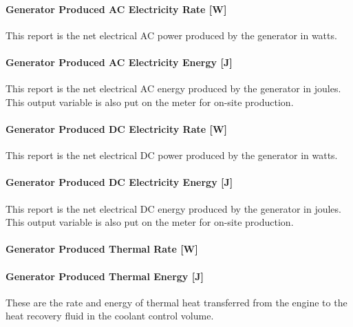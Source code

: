 \paragraph{Generator Produced AC Electricity Rate {[}W{]}}\label{generator-produced-ac-electric-power-w-3}

This report is the net electrical AC power produced by the generator in watts.

\paragraph{Generator Produced AC Electricity Energy {[}J{]}}\label{generator-produced-ac-electric-energy-j-3}

This report is the net electrical AC energy produced by the generator in joules. This output variable is also put on the meter for on-site production.

\paragraph{Generator Produced DC Electricity Rate {[}W{]}}\label{generator-produced-dc-electric-power-w-3}

This report is the net electrical DC power produced by the generator in watts.

\paragraph{Generator Produced DC Electricity Energy {[}J{]}}\label{generator-produced-dc-electric-energy-j-3}

This report is the net electrical DC energy produced by the generator in joules. This output variable is also put on the meter for on-site production.

\paragraph{Generator Produced Thermal Rate {[}W{]}}\label{generator-produced-thermal-rate-w-3}

\paragraph{Generator Produced Thermal Energy {[}J{]}}\label{generator-produced-thermal-energy-j-3}

These are the rate and energy of thermal heat transferred from the engine to the heat recovery fluid in the coolant control volume.

